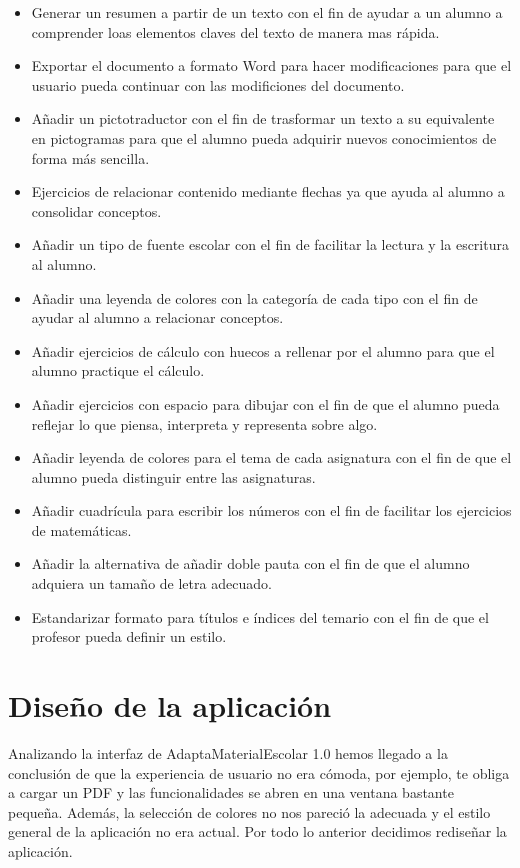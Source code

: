 \begin{itemize}
  \item Generar un resumen a partir de un texto con el fin de ayudar a un alumno a comprender loas elementos claves del texto de manera mas rápida.
  \item Exportar el documento a formato Word para hacer modificaciones para que el usuario pueda continuar con las modificiones del documento. 
  \item Añadir un pictotraductor con el fin de trasformar un texto a su equivalente en pictogramas para que el alumno pueda adquirir nuevos conocimientos de forma más sencilla.
  \item Ejercicios de relacionar contenido mediante flechas ya que ayuda al alumno a consolidar conceptos.
  \item Añadir un tipo de fuente escolar con el fin de facilitar la lectura y la escritura al alumno.
  \item Añadir una leyenda de colores con la categoría de cada tipo con el fin de  ayudar al alumno a relacionar conceptos. 
  \item  Añadir ejercicios de cálculo con huecos a rellenar por el alumno para que el alumno practique el cálculo.
  \item  Añadir ejercicios con espacio para dibujar con el fin de que el alumno pueda reflejar lo que piensa, interpreta y representa sobre algo.
  \item Añadir leyenda de colores para el tema de cada asignatura con el fin de que el alumno pueda distinguir entre las asignaturas.
  \item Añadir cuadrícula para escribir los números con el fin de facilitar los ejercicios de matemáticas.
  \item Añadir la alternativa de añadir doble pauta con el fin de que el alumno adquiera un tamaño de letra adecuado.
  \item Estandarizar formato para títulos e índices del temario con el fin de que el profesor pueda definir un estilo. 

\end{itemize}                                               

\section{Diseño de la aplicación}
\label{disenyoDeLaAplicacion} 
Analizando la interfaz de AdaptaMaterialEscolar 1.0 hemos llegado a la conclusión de que la experiencia de usuario no era cómoda, por ejemplo, te obliga a cargar un PDF y las funcionalidades se abren en una ventana bastante pequeña. Además, la selección de colores no nos pareció la adecuada y el estilo general de la aplicación no era actual. Por todo lo anterior decidimos rediseñar la aplicación.


